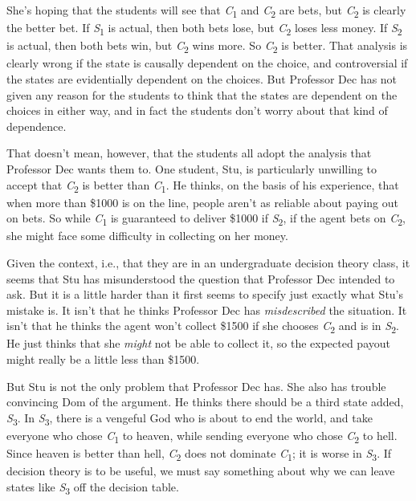 \documentclass[
  11pt,
  letterpaper,
  DIV=11,
  numbers=noendperiod,
  twoside]{scrartcl}
\begin{document}
She's hoping that the students will see that \emph{C}\textsubscript{1}
and \emph{C}\textsubscript{2} are bets, but \emph{C}\textsubscript{2} is
clearly the better bet. If \emph{S}\textsubscript{1} is actual, then
both bets lose, but \emph{C}\textsubscript{2} loses less money. If
\emph{S}\textsubscript{2} is actual, then both bets win, but
\emph{C}\textsubscript{2} wins more. So \emph{C}\textsubscript{2} is
better. That analysis is clearly wrong if the state is causally
dependent on the choice, and controversial if the states are
evidentially dependent on the choices. But Professor Dec has not given
any reason for the students to think that the states are dependent on
the choices in either way, and in fact the students don't worry about
that kind of dependence.

That doesn't mean, however, that the students all adopt the analysis
that Professor Dec wants them to. One student, Stu, is particularly
unwilling to accept that \emph{C}\textsubscript{2} is better than
\emph{C}\textsubscript{1}. He thinks, on the basis of his experience,
that when more than \$1000 is on the line, people aren't as reliable
about paying out on bets. So while \emph{C}\textsubscript{1} is
guaranteed to deliver \$1000 if \emph{S}\textsubscript{2}, if the agent
bets on \emph{C}\textsubscript{2}, she might face some difficulty in
collecting on her money.

Given the context, i.e., that they are in an undergraduate decision
theory class, it seems that Stu has misunderstood the question that
Professor Dec intended to ask. But it is a little harder than it first
seems to specify just exactly what Stu's mistake is. It isn't that he
thinks Professor Dec has \emph{misdescribed} the situation. It isn't
that he thinks the agent won't collect \$1500 if she chooses
\emph{C}\textsubscript{2} and is in \emph{S}\textsubscript{2}. He just
thinks that she \emph{might} not be able to collect it, so the expected
payout might really be a little less than \$1500.

But Stu is not the only problem that Professor Dec has. She also has
trouble convincing Dom of the argument. He thinks there should be a
third state added, \emph{S}\textsubscript{3}. In
\emph{S}\textsubscript{3}, there is a vengeful God who is about to end
the world, and take everyone who chose \emph{C}\textsubscript{1} to
heaven, while sending everyone who chose \emph{C}\textsubscript{2} to
hell. Since heaven is better than hell, \emph{C}\textsubscript{2} does
not dominate \emph{C}\textsubscript{1}; it is worse in
\emph{S}\textsubscript{3}. If decision theory is to be useful, we must
say something about why we can leave states like
\emph{S}\textsubscript{3} off the decision table.
\end{document}
